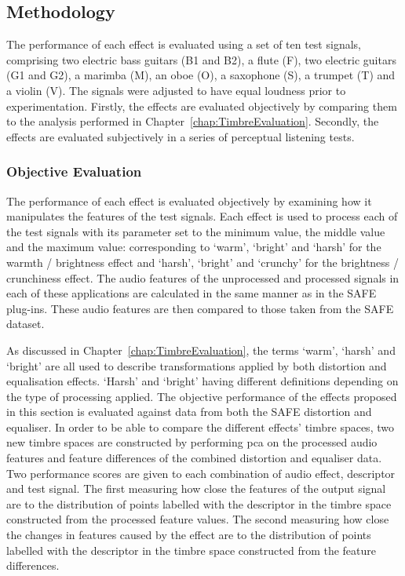 	\subsection{Methodology}
	\label{sec:PerceptualExperiments-SemanticControl-Methodology}
		The performance of each effect is evaluated using a set of ten test signals, comprising two electric bass
		guitars (B1 and B2), a flute (F), two electric guitars (G1 and G2), a marimba (M), an oboe (O), a saxophone
		(S), a trumpet (T) and a violin (V). The signals were adjusted to have equal loudness prior to
		experimentation.  Firstly, the effects are evaluated objectively by comparing them to the analysis
		performed in Chapter~\ref{chap:TimbreEvaluation}. Secondly, the effects are evaluated subjectively in a
		series of perceptual listening tests.

		\subsubsection*{Objective Evaluation}
			The performance of each effect is evaluated objectively by examining how it manipulates the
			features of the test signals. Each effect is used to process each of the test signals with its
			parameter set to the minimum value, the middle value and the maximum value: corresponding to
			`warm', `bright' and `harsh' for the warmth / brightness effect and `harsh', `bright' and `crunchy'
			for the brightness / crunchiness effect. The audio features of the unprocessed and processed
			signals in each of these applications are calculated in the same manner as in the SAFE plug-ins.
			These audio features are then compared to those taken from the SAFE dataset.

			As discussed in Chapter~\ref{chap:TimbreEvaluation}, the terms `warm', `harsh' and `bright' are all
			used to describe transformations applied by both distortion and equalisation effects. `Harsh' and
			`bright' having different definitions depending on the type of processing applied. The objective
			performance of the effects proposed in this section is evaluated against data from both the SAFE
			distortion and equaliser. In order to be able to compare the different effects' timbre spaces, two
			new timbre spaces are constructed by performing \acrshort{pca} on the processed audio features and
			feature differences of the combined distortion and equaliser data. Two performance scores are given
			to each combination of audio effect, descriptor and test signal. The first measuring how close the
			features of the output signal are to the distribution of points labelled with the descriptor in the
			timbre space constructed from the processed feature values. The second measuring how close the
			changes in features caused by the effect are to the distribution of points labelled with the
			descriptor in the timbre space constructed from the feature differences.

